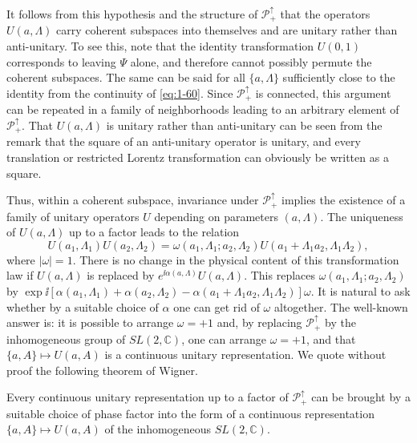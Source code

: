 It follows from this hypothesis and the structure of $\mathcal{P}^{\uparrow}_{+}$
that the operators $U(a,\Lambda)$ carry coherent subspaces into themselves and
are unitary rather than anti-unitary. To see this, note that the identity
transformation $U(0,1)$ corresponds to leaving $\Psi$ alone, and therefore
cannot possibly permute the coherent subspaces. The same can be said for all
$\{a,\Lambda\}$ sufficiently close to the identity from the continuity of
\eqref{eq:1-60}. Since $\mathcal{P}^{\uparrow}_{+}$ is connected, this argument can be
repeated in a family of neighborhoods leading to an arbitrary element of
$\mathcal{P}^{\uparrow}_{+}$. That $U(a,\Lambda)$ is unitary rather than
anti-unitary can be seen from the remark that the square of an anti-unitary
operator is unitary, and every translation or restricted Lorentz transformation
can obviously be written as a square.

Thus, within a coherent subspace, invariance under $\mathcal{P}^{\uparrow}_{+}$
implies the existence of a family of unitary operators $U$ depending on
parameters $(a,\Lambda)$. The uniqueness of $U(a,\Lambda)$ up to a factor leads
to the relation
\begin{equation*}
  U(a_1,\Lambda_1)U(a_2,\Lambda_2)
  =\omega(a_1,\Lambda_1;a_2,\Lambda_2)
    U(a_1+\Lambda_1a_2,\Lambda_1\Lambda_2),
\end{equation*}
where $|\omega|=1$. There is no change in the physical content of this
transformation law if $U(a,\Lambda)$ is replaced by
$e^{\ii\alpha(a,\Lambda)}U(a,\Lambda)$. This replaces
$\omega(a_1,\Lambda_1;a_2,\Lambda_2)$ by
$\exp \ii[\alpha(a_1,\Lambda_1)+\alpha(a_2,\Lambda_2)
-\alpha(a_1+\Lambda_1a_2,\Lambda_1\Lambda_2)]\omega$. It is natural to ask
whether by a suitable choice of $\alpha$ one can get rid of $\omega$ altogether.
The well-known answer is: it is possible to arrange $\omega=+1$ and, by
replacing $\mathcal{P}^{\uparrow}_{+}$ by the inhomogeneous group of
$SL(2,\mathbb{C})$, one can arrange $\omega=+1$, and that
$\{a,A\}\mapsto U(a,A)$ is a continuous unitary representation. We quote
without proof the following theorem of Wigner.

\setcounter{theorem}{1}
\begin{theorem}\label{thm:1-2}
Every continuous unitary representation up to a factor of
$\mathcal{P}^{\uparrow}_{+}$ can be brought by a suitable choice of phase factor
into the form of a continuous representation $\{a,A\}\mapsto U(a,A)$ of the
inhomogeneous $SL(2,\mathbb{C})$.
\end{theorem}

